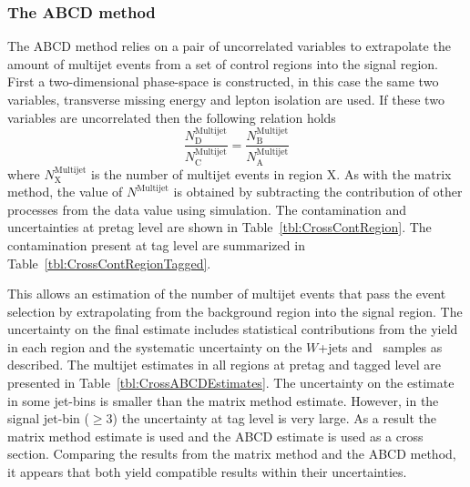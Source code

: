 \subsubsection{The ABCD method}
The ABCD method relies on a pair of uncorrelated variables to extrapolate the amount of multijet events from a set of control regions into the signal region. First a two-dimensional phase-space is constructed, in this case the same two variables, transverse missing energy and lepton isolation are used. If these two variables are uncorrelated then the following relation holds
%
\begin{equation}
  \frac{N^{\textrm{Multijet}}_{\textrm{D}}}{N^{\textrm{Multijet}}_{\textrm{C}}} = \frac{N^{\textrm{Multijet}}_{\textrm{B}}}{N^{\textrm{Multijet}}_\textrm{A}}
\end{equation} 
%
where $N^{\textrm{Multijet}}_{\textrm{X}}$ is the number of multijet events in region X. As with the matrix method, the value of $N^{\textrm{Multijet}}$ is obtained by subtracting the contribution of other processes from the data value using simulation. The contamination and uncertainties at pretag level are shown in Table~\ref{tbl:CrossContRegion}. The contamination present at tag level are summarized in Table~\ref{tbl:CrossContRegionTagged}.

This allows an estimation of the number of multijet events that pass the event selection by extrapolating from the background region into the signal region. The uncertainty on the final estimate includes statistical contributions from the yield in each region and the systematic uncertainty on the $W$+jets and \ttbar\ samples as described. The multijet estimates in all regions at pretag and tagged level are presented in Table~\ref{tbl:CrossABCDEstimates}. The uncertainty on the estimate in some jet-bins is smaller than the matrix method estimate. However, in the signal jet-bin ($\geq$3) the uncertainty at tag level is very large. As a result the matrix method estimate is used and the ABCD estimate is used as a cross section. Comparing the results from the matrix method and the ABCD method, it appears that both yield compatible results within their uncertainties.

